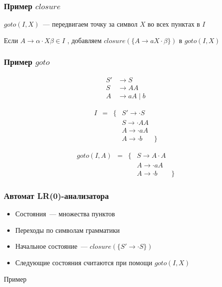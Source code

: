 \documentclass{beamer}
\newcommand{\lritem}[3]{#1 \to #2 \cdot #3}
\begin{document}
\begin{frame}[fragile]
  \transwipe[direction=90]
  \frametitle{Пример $closure$}
  
  
  \begin{center}
    $goto(I, X)$~--- передвигаем точку за символ $X$ во всех пунктах в $I$
  \end{center}

  \begin{center}
    Если $\lritem{A}{\alpha}{X \beta} \in I$ , добавляем $closure(\{ \lritem{A}{aX}{\beta} \})$ в $goto(I, X)$
  \end{center}
\end{frame}


\begin{frame}[fragile]
  \transwipe[direction=90]
  \frametitle{Пример $goto$}
  
  \begin{align*}
    S' &\to S \\ 
    S  &\to A A \\ 
    A  &\to a A \mid b 
  \end{align*}

  \[
  \begin{array}{rcclr}
    I & = & \{ &\lritem{S'}{}{S} & \\
      &   &    &\lritem{S}{}{AA} & \\ 
      &   &    &\lritem{A}{}{aA} & \\ 
      &   &    &\lritem{A}{}{b}  &\}
  \end{array}  
  \]

  \[
  \begin{array}{rcclr}
    goto(I, A) & = & \{ & \lritem{S}{A}{A} & \\ 
               &   &    & \lritem{A}{}{aA} & \\ 
               &   &    & \lritem{A}{}{b}  & \}
  \end{array}
  \]

\end{frame}

\begin{frame}[fragile]
  \transwipe[direction=90]
  \frametitle{Автомат LR(0)-анализатора}
  \begin{itemize}
    \item Состояния~--- множества пунктов
    \item Переходы по символам грамматики 
    \item Начальное состояние~--- $closure(\{\lritem{S'}{}{S}\})$ 
    \item Следующие состояния считаются при помощи $goto(I, X)$
  \end{itemize}

  {\huge Пример}
\end{frame}
\end{document}
